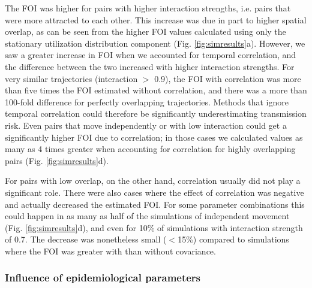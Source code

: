 \documentclass[letterpaper]{article}
\begin{document}
The FOI was higher for pairs with higher interaction strengths, i.e. pairs that were more attracted to each other. This increase was due in part to higher spatial overlap, as can be seen from the higher FOI values calculated using only the stationary utilization distribution component (Fig. \ref{fig:simresults}a). However, we saw a greater increase in FOI when we accounted for temporal correlation, and the difference between the two increased with higher interaction strengths. For very similar trajectories (interaction $>$ 0.9), the FOI with correlation was more than five times the FOI estimated without correlation, and there was a more than 100-fold difference for perfectly overlapping trajectories.
Methods that ignore temporal correlation could therefore be significantly underestimating transmission risk. Even pairs that move independently or with low interaction could get a significantly higher FOI due to correlation; in those cases we calculated values as many as 4 times greater when accounting for correlation for highly overlapping pairs (Fig. \ref{fig:simresults}d). %

For pairs with low overlap, on the other hand, correlation usually did not play a significant role. There were also cases where the effect of correlation was negative and actually decreased the estimated FOI. For some parameter combinations this could happen in as many as half of the simulations of independent movement (Fig. \ref{fig:simresults}d), and even for 10\% of simulations with interaction strength of 0.7. The decrease was nonetheless small ($<$15\%) compared to simulations where the FOI was greater with than without covariance. 

\subsubsection*{Influence of epidemiological parameters}
\end{document}
